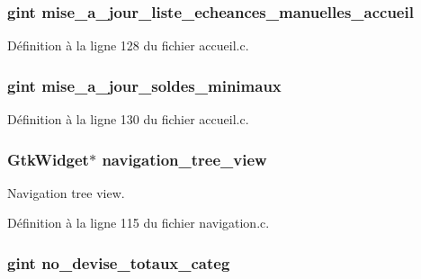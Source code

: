 \subsubsection[{mise\_\-a\_\-jour\_\-liste\_\-echeances\_\-manuelles\_\-accueil}]{\setlength{\rightskip}{0pt plus 5cm}gint {\bf mise\_\-a\_\-jour\_\-liste\_\-echeances\_\-manuelles\_\-accueil}}\label{traitement__variables_8c_a5957dd978b4a0c3ab01e006cedfdf96c}


Définition à la ligne 128 du fichier accueil.c.

\subsubsection[{mise\_\-a\_\-jour\_\-soldes\_\-minimaux}]{\setlength{\rightskip}{0pt plus 5cm}gint {\bf mise\_\-a\_\-jour\_\-soldes\_\-minimaux}}\label{traitement__variables_8c_afaffaedc4fd0ae8638f7158c6777b35b}


Définition à la ligne 130 du fichier accueil.c.

\subsubsection[{navigation\_\-tree\_\-view}]{\setlength{\rightskip}{0pt plus 5cm}GtkWidget$\ast$ {\bf navigation\_\-tree\_\-view}}\label{traitement__variables_8c_a1cd17e8b2fd91a191f8d5d6a7e5f6979}
Navigation tree view. 

Définition à la ligne 115 du fichier navigation.c.

\subsubsection[{no\_\-devise\_\-totaux\_\-categ}]{\setlength{\rightskip}{0pt plus 5cm}gint {\bf no\_\-devise\_\-totaux\_\-categ}}\label{traitement__variables_8c_a8f609654dcfbbcaa6791bcee83d6473d}


